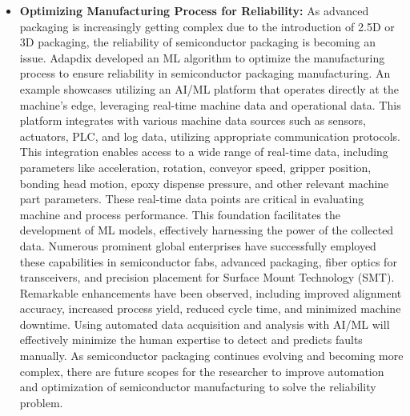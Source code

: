 \begin{itemize}
    \item \textbf{Optimizing Manufacturing Process for Reliability:}
    As advanced packaging is increasingly getting complex due to the introduction of 2.5D or 3D packaging, the reliability of semiconductor packaging is becoming an issue. Adapdix\cite{adapdix_manufacturing} developed an ML algorithm to optimize the manufacturing process to ensure reliability in semiconductor packaging manufacturing. An example showcases utilizing an AI/ML platform that operates directly at the machine's edge, leveraging real-time machine data and operational data. This platform integrates with various machine data sources such as sensors, actuators, PLC, and log data, utilizing appropriate communication protocols. This integration enables access to a wide range of real-time data, including parameters like acceleration, rotation, conveyor speed, gripper position, bonding head motion, epoxy dispense pressure, and other relevant machine part parameters. These real-time data points are critical in evaluating machine and process performance. This foundation facilitates the development of ML models, effectively harnessing the power of the collected data. Numerous prominent global enterprises have successfully employed these capabilities in semiconductor fabs, advanced packaging, fiber optics for transceivers, and precision placement for Surface Mount Technology (SMT). Remarkable enhancements have been observed, including improved alignment accuracy, increased process yield, reduced cycle time, and minimized machine downtime. Using automated data acquisition and analysis with AI/ML will effectively minimize the human expertise to detect and predicts faults manually. As semiconductor packaging continues evolving and becoming more complex, there are future scopes for the researcher to improve automation and optimization of semiconductor manufacturing to solve the reliability problem. 


\end{itemize}
